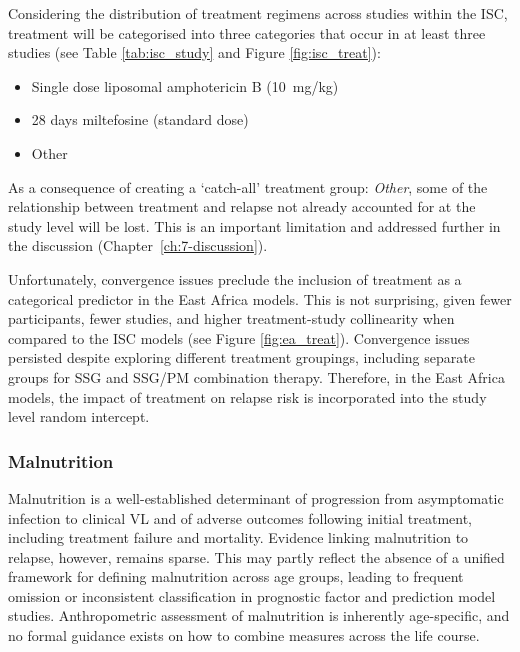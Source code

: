 Considering the distribution of treatment regimens across studies within the ISC, treatment will be categorised into three categories that occur in at least three studies (see Table \ref{tab:isc_study} and Figure \ref{fig:isc_treat}):

\begin{itemize}[noitemsep]
  \item Single dose liposomal amphotericin B (10~mg/kg)
  \item 28 days miltefosine (standard dose)
  \item Other
\end{itemize}

As a consequence of creating a `catch-all' treatment group: \emph{Other}, some of the relationship between treatment and relapse not already accounted for at the study level will be lost. This is an important limitation and addressed further in the discussion (Chapter~\ref{ch:7-discussion}).

Unfortunately, convergence issues preclude the inclusion of treatment as a categorical predictor in the East Africa models. This is not surprising, given fewer participants, fewer studies, and higher treatment-study collinearity when compared to the ISC models (see Figure \ref{fig:ea_treat}). Convergence issues persisted despite exploring different treatment groupings, including separate groups for SSG and SSG/PM combination therapy. Therefore, in the East Africa models, the impact of treatment on relapse risk is incorporated into the study level random intercept.

\subsubsection{\label{sec:malnutrition}Malnutrition}

Malnutrition is a well-established determinant of progression from asymptomatic infection to clinical VL and of adverse outcomes following initial treatment, including treatment failure and mortality\cite{pareyn2025,abongomera2020}. Evidence linking malnutrition to relapse, however, remains sparse. This may partly reflect the absence of a unified framework for defining malnutrition across age groups, leading to frequent omission or inconsistent classification in prognostic factor and prediction model studies. Anthropometric assessment of malnutrition is inherently age-specific, and no formal guidance exists on how to combine measures across the life course.

